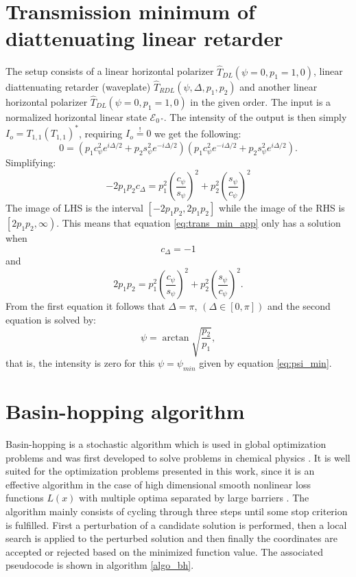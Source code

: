 \section{Transmission minimum of diattenuating linear retarder} 
\label{sec:transmission_min}
The setup consists of a linear horizontal polarizer $\hat{T}_{DL}(\psi=0, p_1=1, 0)$, linear diattenuating retarder (waveplate) $\hat{T}_{RDL}(\psi, \Delta, p_1, p_2)$ and another linear horizontal polarizer $\hat{T}_{DL}(\psi=0, p_1=1, 0)$ in the given order. The input is a normalized horizontal linear state $\bm{\mathcal{E}}_{\SI{0}{\degree}}$. The intensity of the output is then simply $I_o=T_{1,1}(T_{1,1})^*$, requiring $I_o\overset{!}{=}0$ we get the following:
\begin{equation}
    0=(p_1c_\psi^2e^{i\Delta/2}+p_2s_\psi^2e^{-i\Delta/2})(p_1c_\psi^2e^{-i\Delta/2}+p_2s_\psi^2e^{i\Delta/2}).
\end{equation}
Simplifying:
\begin{equation}
    \label{eq:trans_min_app}
    -2p_1p_2c_\Delta = p_1^2\left(\frac{c_\psi}{s_\psi}\right)^2 + p_2^2\left(\frac{s_\psi}{c_\psi}\right)^2
\end{equation}
The image of LHS is the interval $\left[-2p_1p_2, 2p_1p_2\right]$ while the image of the RHS is $\left[2p_1p_2, \infty\right)$. This means that equation \ref{eq:trans_min_app} only has a solution when
\begin{equation}
    c_\Delta=-1
\end{equation}
and
\begin{equation}
    2p_1p_2 = p_1^2\left(\frac{c_\psi}{s_\psi}\right)^2 + p_2^2\left(\frac{s_\psi}{c_\psi}\right)^2.
\end{equation}
From the first equation it follows that $\Delta=\pi$, $(\Delta \in [0,\pi])$ and the second equation is solved by:
\begin{equation}
    \label{eq:psi_min}
    \psi = \arctan \sqrt{\frac{p_2}{p_1}},
\end{equation}
that is, the intensity is zero for this $\psi=\psi_{min}$ given by equation \ref{eq:psi_min}.

\section{Basin-hopping algorithm}
\label{sec:basin_hopping_algo}

Basin-hopping is a stochastic algorithm which is used in global optimization problems and was first developed to solve problems in chemical physics \cite{Wales1997}. It is well suited for the optimization problems presented in this work, since it is an effective algorithm in the case of high dimensional smooth nonlinear loss functions $L(x)$ with multiple optima separated by large barriers \cite{Olson2012, Wu2020}. The algorithm mainly consists of cycling through three steps until some stop criterion is fulfilled. First a perturbation of a candidate solution is performed, then a local search is applied to the perturbed solution and then finally the coordinates are accepted or rejected based on the minimized function value. The associated pseudocode is shown in algorithm \ref{algo_bh}. 

